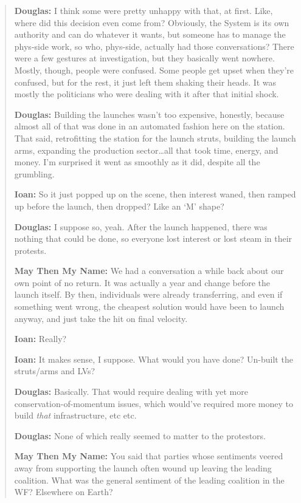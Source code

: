 \begin{quote}
\textbf{Douglas:} I think some were pretty unhappy with that, at first. Like, where did this decision even come from? Obviously, the System is its own authority and can do whatever it wants, but someone has to manage the phys-side work, so who, phys-side, actually had those conversations? There were a few gestures at investigation, but they basically went nowhere. Mostly, though, people were confused. Some people get upset when they're confused, but for the rest, it just left them shaking their heads. It was mostly the politicians who were dealing with it after that initial shock.

\textbf{Douglas:} Building the launches wasn't too expensive, honestly, because almost all of that was done in an automated fashion here on the station. That said, retrofitting the station for the launch struts, building the launch arms, expanding the production sector\ldots all that took time, energy, and money. I'm surprised it went as smoothly as it did, despite all the grumbling.

\textbf{Ioan:} So it just popped up on the scene, then interest waned, then ramped up before the launch, then dropped? Like an `M' shape?

\textbf{Douglas:} I suppose so, yeah. After the launch happened, there was nothing that could be done, so everyone lost interest or lost steam in their protests.

\textbf{May Then My Name:} We had a conversation a while back about our own point of no return. It was actually a year and change before the launch itself. By then, individuals were already transferring, and even if something went wrong, the cheapest solution would have been to launch anyway, and just take the hit on final velocity.

\textbf{Ioan:} Really?

\textbf{Ioan:} It makes sense, I suppose. What would you have done? Un-built the struts/arms and LVs?

\textbf{Douglas:} Basically. That would require dealing with yet more conservation-of-momentum issues, which would've required more money to build \emph{that} infrastructure, etc etc.

\textbf{Douglas:} None of which really seemed to matter to the protestors.

\textbf{May Then My Name:} You said that parties whose sentiments veered away from supporting the launch often wound up leaving the leading coalition. What was the general sentiment of the leading coalition in the WF? Elsewhere on Earth?


\end{quote}
